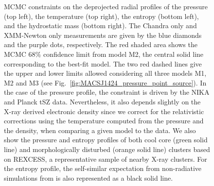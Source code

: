 \documentclass[twocolumn,traditabstract]{aa}
\newcommand{\rexcess}{{\gwpfont REXCESS}}
\begin{document}
\begin{figure}[h]
\caption{\footnotesize MCMC constraints on the deprojected radial profiles of the pressure (top left), the temperature (top right), the entropy (bottom left), and the hydrostatic mass (bottom right). The Chandra only and XMM-Newton only measurements are given by the blue diamonds and the purple dots, respectively. The red shaded area shows the MCMC 68\% confidence limit from model M2, the central solid line corresponding to the best-fit model. The two red dashed lines give the upper and lower limits allowed considering all three models M1, M2 and M3 (see Fig.~\ref{fig:MACSJ1424_pressure_point_source}). In the case of the pressure profile, the constraint is driven by the NIKA and Planck tSZ data. Nevertheless, it also depends slightly on the X-ray derived electronic density since we correct for the relativistic corrections using the temperature computed from the pressure and the density, when comparing a given model to the data. We also show the pressure \citep{arnaud2010} and entropy \citep{pratt2010} profiles of both cool core (green solid line) and morphologically disturbed (orange solid line) clusters based on \rexcess, a representative sample of nearby X-ray clusters. For the entropy profile, the self-similar expectation from non-radiative simulations from \cite{voit2005b} is also represented as a black solid line.}
\label{fig:MACSJ1424_MCMC_tk_profile}
\end{figure}
\end{document}
